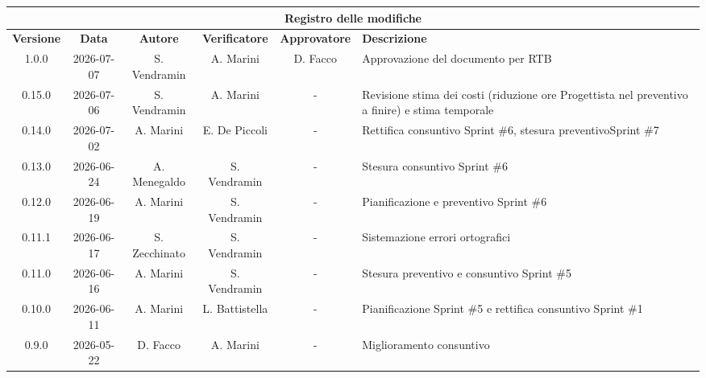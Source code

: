 \documentclass[a4paper, 10pt, colorlinks=true, linkcolor=black, urlcolor=blue, citecolor=blue, hidelinks]{article}
\renewcommand{\arraystretch}{1.2}
\begin{document}
\setlength{\emergencystretch}{3em}

\newcommand{\titolo}{Piano di Progetto}
\newcommand{\dataverbale}{}
\newcommand{\dataversione}{2026-07-10}
\newcommand{\versione}{1.1.0}
\newcommand{\stato}{Stesura}
\newcommand{\destinatari}{The Bitless, prof. Tullio Vardanega, prof. Riccardo Cardin}
\def\templatedir{../../../templates}

\begin{titlepage}

\end{titlepage}

\newpage
\begin{center}
    \small
    \renewcommand{\arraystretch}{1.25}
    \begin{tabularx}{\textwidth}{|c|c|c|c|c|X|}
        \hline
        \multicolumn{6}{|c|}{\textbf{Registro delle modifiche}} \\
        \hline
        \textbf{Versione} & \textbf{Data} & \textbf{Autore} & \textbf{Verificatore} & \textbf{Approvatore} & \textbf{Descrizione} \\
        \hline
        1.0.0 & 2026-07-07 & S. Vendramin & A. Marini & D. Facco & Approvazione del documento per RTB \\
        \hline
        0.15.0 & 2026-07-06 & S. Vendramin & A. Marini & - & Revisione stima dei costi (riduzione ore Progettista nel preventivo a finire) e stima temporale \\
        \hline
        0.14.0 & 2026-07-02 & A. Marini & E. De Piccoli & - & Rettifica consuntivo Sprint \#6, stesura preventivoSprint \#7 \\
        \hline
        0.13.0 & 2026-06-24 & A. Menegaldo & S. Vendramin & - & Stesura consuntivo Sprint \#6 \\
        \hline
        0.12.0 & 2026-06-19 & A. Marini & S. Vendramin & - & Pianificazione e preventivo Sprint \#6 \\
        \hline
        0.11.1 & 2026-06-17 & S. Zecchinato & S. Vendramin & - & Sistemazione errori ortografici \\
        \hline
        0.11.0 & 2026-06-16 & A. Marini & S. Vendramin & - & Stesura preventivo e consuntivo Sprint \#5 \\
        \hline
        0.10.0 & 2026-06-11 & A. Marini & L. Battistella & - & Pianificazione Sprint \#5 e rettifica consuntivo Sprint \#1 \\
        \hline
        0.9.0 & 2026-05-22 & D. Facco & A. Marini & - & Miglioramento consuntivo \\

\end{tabularx}
\end{center}
\end{document}
